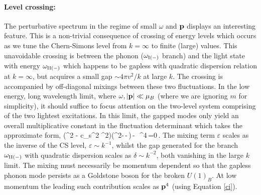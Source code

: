 \paragraph{Level crossing:} The perturbative spectrum in the regime of small $\omega$ and ${\bf p}$ displays an interesting feature. This is a non-trivial consequence of crossing of energy levels which occurs as we tune the Chern-Simons level from $k=\infty$ to finite (large) values. This unavoidable crossing is between the phonon ($\omega_{\rm I (-)}$  branch) and the light state with energy $\omega_{\rm II(-)}$ which happens to be gapless with quadratic dispersion relation at $k=\infty$, but acquires a small gap $\sim 4\pi v^2/k$ at large $k$.  The crossing is accompanied by off-diagonal mixings between these two fluctuations. In the low energy, long wavelength limit, where $\omega, |{\bf p}| \ll \mu_B$ (where we are ignoring  $m$ for simplicity), it should suffice to focus attention on the two-level system comprising of the two lightest excitations. In this limit, the gapped modes only yield an overall multiplicative constant in the fluctuation determinant which takes the approximate form,
\be
\left(\omega^2 - c_s^2 \p^2\right)\left(\omega^2-\,-\,\delta\right)\,-\,\varepsilon\, \p^4\,=0\,.\label{mixing}
\ee
The mixing term $\varepsilon$ scales as the inverse of the CS level, $\varepsilon\sim k^{-1}$, whilst  the gap generated for the branch $\omega_{\rm II(-)}$ with quadratic dispersion scales as  $\delta\sim k^{-2}$,  both  vanishing in the large $k$ limit.  The mixing must necessarily be momentum dependent so that the gapless phonon mode persists as a Goldstone boson for the broken $U(1)_B$. At low momentum the leading such contribution scales as ${\bf p}^4$ (using Equation \eqref{ci}). 
